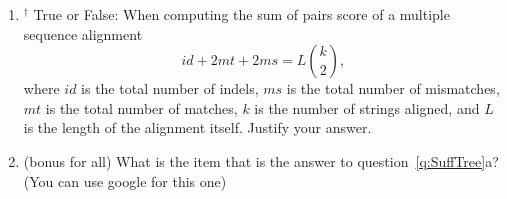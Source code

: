 \documentclass[11pt, oneside]{article}   	%
\begin{document}
\begin{enumerate}
\clearpage

\item$^\dag$ True or False: When computing the sum of pairs score of a multiple sequence alignment 
 \[id + 2 mt + 2 ms = L {k\choose 2},\] 
where $id$ is the total number of indels, $ms$ is the total number of mismatches, $mt$ is the total number of matches, $k$ is the number of strings aligned, and $L$ is the length of the alignment itself. 
Justify your answer. 

\item (bonus for all) What is the item that is the answer to question~\ref{q:SuffTree}a? (You can use google for this one)

\end{enumerate}
\end{document}
